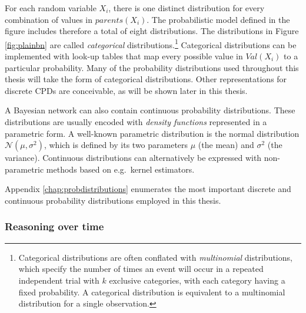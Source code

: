 
For each random variable $X_i$, there is one distinct distribution for every combination of values in $\mathit{parents}(X_i)$. The probabilistic model defined in the figure includes therefore a total of eight distributions.  The distributions in Figure \ref{fig:plainbn} are called \textit{categorical} distributions.\footnote{Categorical distributions are often conflated with \textit{multinomial} distributions, which specify the number of times an event will occur in a repeated independent trial with $k$ exclusive categories, with each category having a fixed probability.  A categorical distribution is equivalent to a multinomial distribution for a single observation.} Categorical distributions can be implemented with look-up tables that map every possible value in $\mathit{Val}(X_i)$ to a particular probability.  Many of the probability distributions used throughout this thesis will take the form of categorical distributions. Other representations for discrete CPDs are conceivable, as will be shown later in this thesis.

A Bayesian network can also contain continuous probability distributions.  These distributions are usually encoded with \textit{density functions} represented in a parametric form.  A well-known parametric distribution is the normal distribution $\mathcal{N}(\mu,\sigma^2)$, which is defined by its two parameters $\mu$ (the mean) and $\sigma^2$ (the variance). Continuous distributions can alternatively be expressed with non-parametric methods based on e.g.\ kernel estimators.  


Appendix \ref{chap:probdistributions} enumerates the most important discrete and continuous probability distributions employed in this thesis.  %

\subsubsection*{Reasoning over time}

